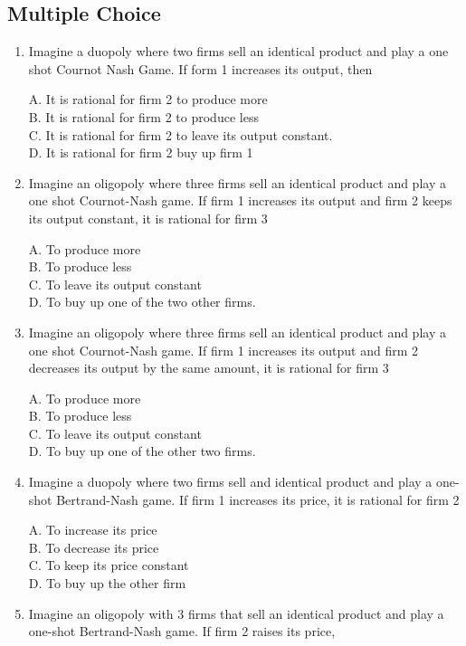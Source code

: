 \documentclass[
]{book}
\begin{document}
\hypertarget{multiple-choice-8}{%
\subsection{Multiple Choice}\label{multiple-choice-8}}

\begin{enumerate}
\def\labelenumi{\arabic{enumi}.}
\item
  Imagine a duopoly where two firms sell an identical product and play a one shot Cournot Nash Game. If form 1 increases its output, then

  A. It is rational for firm 2 to produce more\\
  B. It is rational for firm 2 to produce less\\
  C. It is rational for firm 2 to leave its output constant.\\
  D. It is rational for firm 2 buy up firm 1
\item
  Imagine an oligopoly where three firms sell an identical product and play a one shot Cournot-Nash game. If firm 1 increases its output and firm 2 keeps its output constant, it is rational for firm 3

  A. To produce more\\
  B. To produce less\\
  C. To leave its output constant\\
  D. To buy up one of the two other firms.
\item
  Imagine an oligopoly where three firms sell an identical product and play a one shot Cournot-Nash game. If firm 1 increases its output and firm 2 decreases its output by the same amount, it is rational for firm 3

  A. To produce more\\
  B. To produce less\\
  C. To leave its output constant\\
  D. To buy up one of the other two firms.
\item
  Imagine a duopoly where two firms sell and identical product and play a one-shot Bertrand-Nash game. If firm 1 increases its price, it is rational for firm 2

  A. To increase its price\\
  B. To decrease its price\\
  C. To keep its price constant\\
  D. To buy up the other firm
\item
  Imagine an oligopoly with 3 firms that sell an identical product and play a one-shot Bertrand-Nash game. If firm 2 raises its price,


\end{enumerate}
\end{document}
